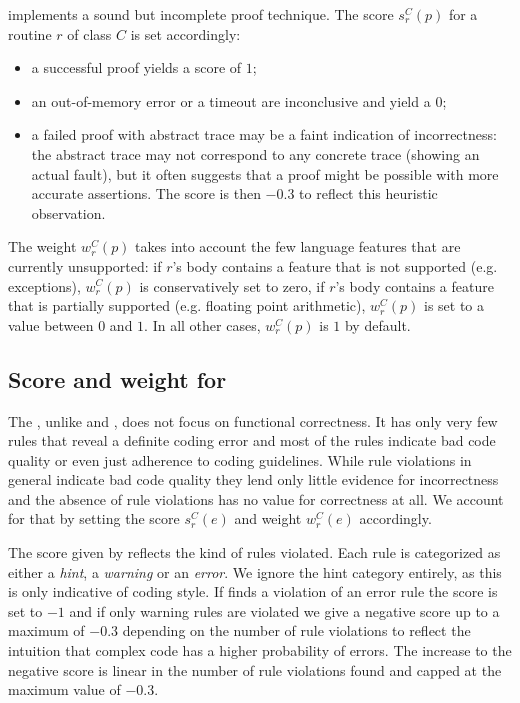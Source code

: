 \AutoProof implements a sound but incomplete proof technique.
The score $s_r^C(p)$ for a routine $r$ of class $C$ is set accordingly:
\begin{itemize}
	\item 
     a successful proof yields a score of $1$;
	\item
     an out-of-memory error or a timeout are inconclusive and yield a $0$;
	\item
     a failed proof with abstract trace may be a faint indication of
     incorrectness: the abstract trace may not correspond to any
     concrete trace (showing an actual fault), but it often suggests
     that a proof might be possible with more accurate assertions.
     The score is then $-0.3$ to reflect this heuristic
     observation.
\end{itemize}

The weight $w_r^C(p)$ takes into account the few language features that are currently unsupported: if $r$'s body contains a feature that is not supported (e.g. exceptions), $w_r^C(p)$ is conservatively set to zero, if $r$'s body contains a feature that is partially supported (e.g. floating point arithmetic), $w_r^C(p)$ is set to a value between $0$ and $1$.
In all other cases, $w_r^C(p)$ is $1$ by default.


\subsection{Score and weight for \Inspector}

The \Inspector, unlike \AutoTest and \AutoProof, does not focus on functional correctness. It has only very few rules that reveal a definite coding error and most of the rules indicate bad code quality or even just adherence to coding guidelines.
While rule violations in general indicate bad code quality they lend only little evidence for incorrectness and the absence of rule violations has no value for correctness at all.
We account for that by setting the score $s_r^C(e)$ and weight $w_r^C(e)$ accordingly.

The score given by \Inspector reflects the kind of rules violated. Each rule is categorized as either a \emph{hint}, a \emph{warning} or an \emph{error}. We ignore the hint category entirely, as this is only indicative of coding style. If \Inspector finds a violation of an error rule the score is set to $-1$ and if only warning rules are violated we give a negative score up to a maximum of $-0.3$ depending on the number of rule violations to reflect the intuition that complex code has a higher probability of errors. The increase to the negative score is linear in the number of rule violations found and capped at the maximum value of $-0.3$.

